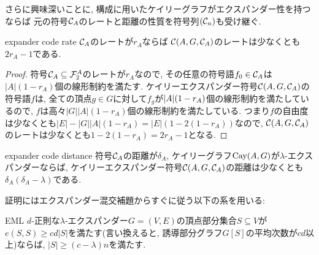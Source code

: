 さらに興味深いことに, 構成に用いたケイリーグラフがエクスパンダー性を持つならば
元の符号$\mathcal{C}_A$のレートと距離の性質を符号列$(\mathcal{C}_n)$も受け継ぐ.
%
\begin{lemma}{}{expander code rate}
    $\mathcal{C}_A$のレートが$r_A$ならば
    $\mathcal{C}(A,G,\mathcal{C}_A)$のレートは少なくとも$2r_A-1$である.
\end{lemma}
\begin{proof}
    符号$\mathcal{C}_A\subseteq\mathcal{F}_2^A$のレートが$r_A$なので,
    その任意の符号語$f_0\in \mathcal{C}_A$は$|A|(1-r_A)$個の線形制約を満たす.
    ケイリーエクスパンダー符号$\mathcal{C}(A,G,\mathcal{C}_A)$の符号語$f$は,
    全ての頂点$g\in G$に対して$f_g$が$\lvert A\rvert(1-r_A)$個の線形制約を満たしているので,
    $f$は高々$|G||A|(1-r_A)$個の線形制約を満たしている.
    つまり$f$の自由度は少なくとも$|E|-|G||A|(1-r_A)=|E|(1-2(1-r_A))$なので,
    $\mathcal{C}(A,G,\mathcal{C}_A)$のレートは少なくとも$1-2(1-r_A)=2r_A-1$となる.
\end{proof}
%
\begin{lemma}{}{expander code distance}
    符号$\mathcal{C}_A$の距離が$\delta_A$, ケイリーグラフ$\mathrm{Cay}(A,G)$が$\lambda$-エクスパンダーならば,
    ケイリーエクスパンダー符号$\mathcal{C}(A,G,\mathcal{C}_A)$の距離は少なくとも$\delta_A(\delta_A-\lambda)$である.
\end{lemma}
証明にはエクスパンダー混交補題からすぐに従う以下の系を用いる:
\begin{corollary}{}{EML}
    $d$-正則な$\lambda$-エクスパンダー$G=(V,E)$の頂点部分集合$S\subseteq V$が$e(S,S)\geq cd|S|$を満たす(言い換えると, 誘導部分グラフ$G[S]$の平均次数が$cd$以上)ならば, $|S|\geq (c-\lambda)n$を満たす.
\end{corollary}
%

